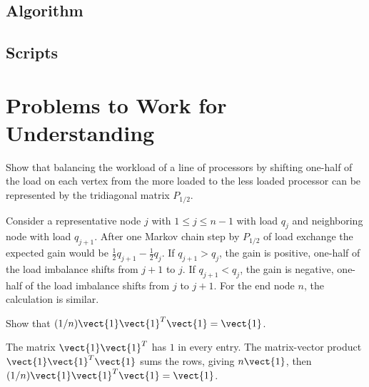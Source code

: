 \documentclass[12pt]{article}
\begin{document}
\subsection*{Algorithm}

\subsection*{Scripts}


\hr

\section*{Problems to Work for Understanding}

\renewcommand{\theexerciseseries}{}
\renewcommand{\theexercise}{\arabic{exercise}}

\begin{exercise}
    Show that balancing the workload of a line of processors by shifting
    one-half of the load on each vertex from the more loaded to the less
    loaded processor can be represented by the tridiagonal matrix \( P_{1/2}
    \).
\end{exercise}
\begin{solution}
    Consider a representative node \( j \) with \( 1 \le j \le n-1 \)
    with load \( q_j \) and neighboring node with load \( q_{j+1} \).
    After one Markov chain step by \( P_{1/2} \) of load exchange the
    expected gain would be \( \frac{1} {2} q_{j+1} - \frac{1}{2} q_{j} \).
    If \( q_{j+1} > q_j \), the gain is positive, one-half of the load
    imbalance shifts from \( j+1 \) to \( j \).  If \( q_{j+1} < q_j \),
    the gain is negative, one-half of the load imbalance shifts from \(
    j \) to \( j+1 \).  For the end node \( n \), the calculation is
    similar.
\end{solution}

\begin{exercise}
    Show that \( (1/n) \vect{1}\vect{1}^T \vect{1} = \vect{1} \).
\end{exercise}
\begin{solution}
    The matrix \( \vect{1}\vect{1}^T \) has \( 1 \) in every entry. The
    matrix-vector product \( \vect{1}\vect{1}^T \vect{1} \) sums the
    rows, giving \( n \vect{1} \), then \( (1/n) \vect{1}\vect{1}^T
    \vect{1} = \vect{1} \).
\end{solution}
\end{document}
